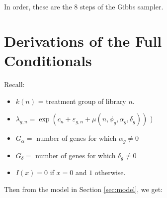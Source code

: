 \documentclass{article}\usepackage{graphicx, color}
\providecommand{\e}{\varepsilon}
\begin{document}
\begin{flushleft}
In order, these are the 8 steps of the Gibbs sampler.






\appendix

\section{Derivations of the Full Conditionals}

Recall:

\begin{itemize}
\item  $k(n)$ = treatment group of library $n$.
\item $\lambda_{g, n} = \exp(c_n + \e_{g, n} + \mu(n, \phi_g, \alpha_g, \delta_g))$ )
\item $G_\alpha = $ number of genes for which $\alpha_g \ne 0$
\item $G_\delta = $ number of genes for which $\delta_g \ne 0$
\item $I(x) = 0$ if $x = 0$ and $1$ otherwise.
\end{itemize}

 Then from the model in Section \ref{sec:model}, we get: 


\end{flushleft}
\end{document}
